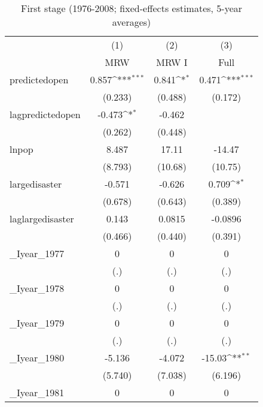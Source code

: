 \begin{table}[htbp]\centering
\def\sym#1{\ifmmode^{#1}\else\(^{#1}\)\fi}
\caption{First stage (1976-2008; fixed-effects estimates, 5-year averages)}
\begin{tabular}{l*{3}{c}}
\hline\hline
          &\multicolumn{1}{c}{(1)}&\multicolumn{1}{c}{(2)}&\multicolumn{1}{c}{(3)}\\
          &\multicolumn{1}{c}{MRW}&\multicolumn{1}{c}{MRW I}&\multicolumn{1}{c}{Full}\\
\hline
predictedopen&    0.857\sym{***}&    0.841\sym{*}  &    0.471\sym{***}\\
          &  (0.233)         &  (0.488)         &  (0.172)         \\
[1em]
lagpredictedopen&   -0.473\sym{*}  &   -0.462         &                  \\
          &  (0.262)         &  (0.448)         &                  \\
[1em]
lnpop     &    8.487         &    17.11         &   -14.47         \\
          &  (8.793)         &  (10.68)         &  (10.75)         \\
[1em]
largedisaster&   -0.571         &   -0.626         &    0.709\sym{*}  \\
          &  (0.678)         &  (0.643)         &  (0.389)         \\
[1em]
laglargedisaster&    0.143         &   0.0815         &  -0.0896         \\
          &  (0.466)         &  (0.440)         &  (0.391)         \\
[1em]
\_Iyear\_1977&        0         &        0         &        0         \\
          &      (.)         &      (.)         &      (.)         \\
[1em]
\_Iyear\_1978&        0         &        0         &        0         \\
          &      (.)         &      (.)         &      (.)         \\
[1em]
\_Iyear\_1979&        0         &        0         &        0         \\
          &      (.)         &      (.)         &      (.)         \\
[1em]
\_Iyear\_1980&   -5.136         &   -4.072         &   -15.03\sym{**} \\
          &  (5.740)         &  (7.038)         &  (6.196)         \\
[1em]
\_Iyear\_1981&        0         &        0         &        0         \\

\end{tabular}
\end{table}
